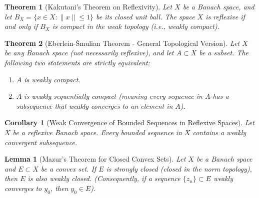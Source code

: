 \documentclass[11pt,a4paper]{article}
\theoremstyle{plain}
\newtheorem{theorem}{Theorem}[section]
\newtheorem{corollary}{Corollary}[theorem]
\newtheorem{lemma}{Lemma}[section]
\theoremstyle{definition}
\begin{document}
\begin{theorem}[Kakutani's Theorem on Reflexivity]
    Let $X$ be a Banach space, and let $B_X = \{x \in X : \|x\| \le 1\}$ be its closed unit ball.
    The space $X$ is reflexive if and only if $B_X$ is compact in the weak topology (i.e., weakly compact).
\end{theorem}

\begin{theorem}[Eberlein-\v{S}mulian Theorem - General Topological Version]
    Let $X$ be any Banach space (not necessarily reflexive), and let $A \subset X$ be a subset.
    The following two statements are strictly equivalent:
    \begin{enumerate}
        \item $A$ is weakly compact.
        \item $A$ is weakly sequentially compact (meaning every sequence in $A$ has a subsequence that weakly converges to an element in $A$).
    \end{enumerate}
\end{theorem}

\begin{corollary}[Weak Convergence of Bounded Sequences in Reflexive Spaces]
    Let $X$ be a reflexive Banach space. Every bounded sequence in $X$ contains a weakly convergent subsequence.
\end{corollary}


\begin{lemma}[Mazur's Theorem for Closed Convex Sets]
    Let \(X\) be a Banach space and \(E \subset X\) be a convex set.
    If \(E\) is strongly closed (closed in the norm topology), then \(E\) is also weakly closed.
    (Consequently, if a sequence \(\{z_n\} \subset E\) weakly converges to \(y_0\), then \(y_0 \in E\)).
\end{lemma}

\end{document}
